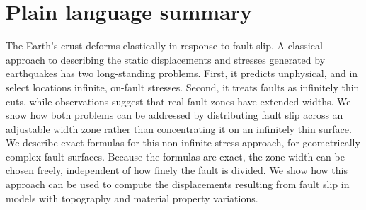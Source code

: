 \documentclass[12pt]{article}
\begin{document}
\section*{Plain language summary}
The Earth's crust deforms elastically in response to fault slip. A classical approach to describing the static displacements and stresses generated by earthquakes has two long-standing problems.  First, it predicts unphysical, and in select locations infinite, on-fault stresses.  Second, it treats faults as infinitely thin cuts, while observations suggest that real fault zones have extended widths.  We show how both problems can be addressed by distributing fault slip across an adjustable width zone rather than concentrating it on an infinitely thin surface. We describe exact formulas for this non-infinite stress approach, for geometrically complex fault surfaces. Because the formulas are exact, the zone width can be chosen freely, independent of how finely the fault is divided.  We show how this approach can be used to compute the displacements resulting from fault slip in models with topography and material property variations.


\clearpage
\end{document}
